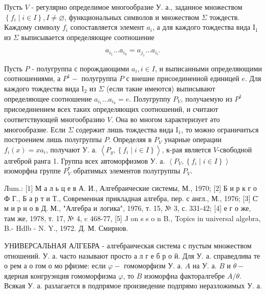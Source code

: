 \documentclass[10pt]{article}
\begin{document}
Пусть $V$ - регулярно определимое многообразие У. а., заданное множеством $\left\{f_{i} \mid i \in I\right\}, I \neq \varnothing$, функциональных символов и множеством $\Sigma$ тождеств. Каждому символу $f_{i}$ сопоставляется элемент $a_{i}$, а для каждого тождества вида $\mathrm{I}_{1}$ из $\Sigma$ выписывается определяющее соотношение



\[

a_{i_{1}} \ldots a_{i_{k}}=a_{j_{1}} \ldots a_{i_{l}} .

\]



Пусть $P$ - полугруппа с порождающими $a_{i}, i \in I$, и выписанными определяющими соотношениями, а $P^{1}-$ полугруппа $P$ с внешне присоединенной единицей $e$. Для каждого тождества вида $\mathrm{I}_{2}$ из $\Sigma$ (если такие имеются) выписывают определяющее соотношение $a_{i_{1}} \ldots a_{i_{k}}=e$. Полугруппу $P_{V}$, получаемую из $P^{1}$ присоединением всех таких определяющих соотношений, и считают соответствующей многообразию $V$. Она во многом характеризует әто многообразие. Если $\Sigma$ содержит лишь тождества вида $\mathrm{I}_{1}$, то можно ограничиться построением лишь полугруппы $P$. Определяя в $P_{V}$ унарные операции $f_{i}(x)=x a_{i}$, получают У. а. $\left\langle P_{y},\left\{f_{i} \mid i \in I\right\}\right\rangle$, к-рая является $V$-свободной алгеброй ранга 1. Группа всех автоморфизмов У. а. $\left\langle P_{V},\left\{f_{i} \mid i \in I\right\}\right\rangle$ изоморфна группе $P_{V}^{*}$ обратимых элементов полугруппы $P_{V}$.



Лum.: [1] М а л ь ц е в А. И., Алгебраические системы, М., 1970; [2] Б и р к г о Ф Г., Б а р т и Т., Современная прикладная алгебра, пер. с англ., М., 1976; [3] С̈ м и р н о в Д. М., "Алгебра и логика", 1976, т. 15, № 3, с. 331-42; [4] е г о же, там же, 1978, т. 17, № 4, c 468-77, [5] J on s s o n B., Topics in universal algebra, B.- Hdlb - N. Y., 1972. Д. М. Смирнов.



УНИВЕРСАЛЬНАЯ АЛГЕБРА - алгебраическая система с пустым множеством отношений. У. а. часто называют просто а л г е б р о й. Для У. а. справедлива те о рем а о гом о мо рфизме: если $\varphi-$ гомоморфизм У. а. $A$ на У. а. $B$ и $\theta-$ ядерная конгруэнция гомоморфизма $\varphi$, то $B$ изоморфна факторалгебре $A / \theta$. Всякая У. а. разлагается в подпрямое произведение подпрямо неразложимых У. а.
\end{document}
